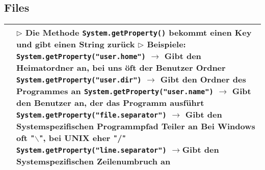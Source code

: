 \subsection{Files}


	\begin{table}[H]
	\label{Files}
	\begin{tabular}{ | p{4cm} p{13.5cm} | }
	

	\hline
	\makecell[l]{Systemproperties} & 
	\makecell[l]
	{
	$\rhd$ Die Methode \texttt{System.getProperty()} bekommt einen Key \\
	\hspace{0.35cm} und gibt einen String zurück \\
	$\rhd$ Beispiele: \\
	\hspace{0.4cm} \texttt{System.getProperty("user.home")} \\
	\hspace{0.7cm} $\rightarrow$ Gibt den Heimatordner an, bei uns öft der Benutzer Ordner \\
	\hspace{0.4cm} \texttt{System.getProperty("user.dir")} \\
	\hspace{0.7cm} $\rightarrow$ Gibt den Ordner des Programmes an \\
	\hspace{0.4cm} \texttt{System.getProperty("user.name")} \\
	\hspace{0.7cm} $\rightarrow$ Gibt den Benutzer an, der das Programm ausführt \\
	\hspace{0.4cm} \texttt{System.getProperty("file.separator")} \\
	\hspace{0.7cm} $\rightarrow$ Gibt den Systemspezifischen Programmpfad Teiler an \\
	\hspace{1.25cm} Bei Windows oft "$\backslash$", bei UNIX eher "/" \\
	\hspace{0.4cm} \texttt{System.getProperty("line.separator")} \\
	\hspace{0.7cm} $\rightarrow$Gibt den Systemspezifischen Zeilenumbruch an \\
	} 	\\ \hline



\end{tabular}
\end{table}
